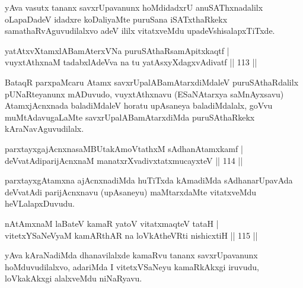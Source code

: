 \begin{artha}
yAva vasutx tananx savxrUpavanunx hoMdidadxrU anuSAThxnadalilx oLapaDadeV idadxre koDaliyaMte puruSana iSATxthaRkekx samathaRvAguvudilalxvo adeV ililx vitatxveMdu upadeVshisalapxTiTxde.
\end{artha}


\begin{shl}
yatAtxvXtamxlABamAterxVNa puruSAthaRsamApitxkaqtf |\\
vuyxtAthxnaM tadabxlAdeVva na tu yatAsxyXdagxvAdivatf \hfill || 113 ||
\end{shl}

\begin{artha}
BataqR parxpaMcaru Atamx savxrUpalABamAtarxdiMdaleV puruSAthaRdalilx pUNaRteyanunx mADuvudo, vuyxtAthxnavu (ESaNAtarxya saMnAyxsavu) AtamxjAcnxnada baladiMdaleV horatu upAsaneya baladiMdalalx, goVvu muMtAdavugaLaMte savxrUpalABamAtarxdiMda puruSAthaRkekx kAraNavAguvudilalx. 
\end{artha}%

\begin{shl}
parxtayxgajAcnxnasaMBUtakAmoVtathxM sAdhanAtamxkamf |\\
deVvatAdiparijAcnxnaM manatxrXvadivxtatxmucayxteV \hfill || 114 ||
\end{shl}

\begin{artha}
parxtayxgAtamxna ajAcnxnadiMda huTiTxda kAmadiMda sAdhanarUpavAda deVvatAdi parijAcnxnavu (upAsaneyu) maMtarxdaMte vitatxveMdu heVLalapxDuvudu.
\end{artha}

\begin{shl}
nA\s \s tAmxnaM laBateV kamaR yatoV vitatxmaqteV tataH |\\
vitetxYSaNeVyaM kamARthAR na loVkAtheVRti nishicxtiH \hfill || 115 ||
\end{shl}

\begin{artha}
yAva kAraNadiMda dhanavilalxde kamaRvu tananx savxrUpavanunx hoMduvudilalxvo, adariMda I vitetxVSaNeyu kamaRkAkxgi iruvudu, loVkakAkxgi alalxveMdu niNaRyavu.
\end{artha}



